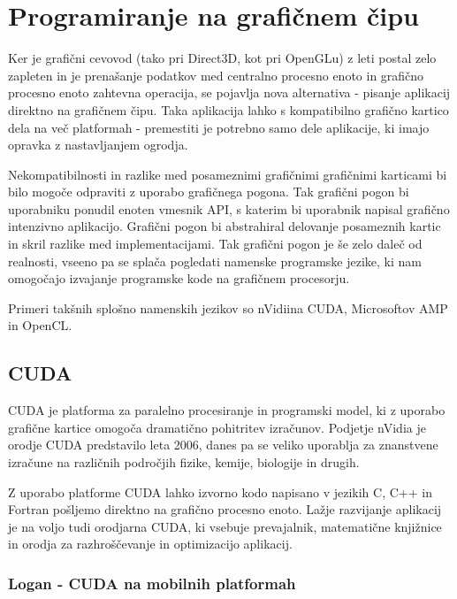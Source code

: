 \chapter{Programiranje na grafičnem čipu}


Ker je grafični cevovod (tako pri Direct3D, kot pri OpenGLu) z leti postal zelo zapleten in je prenašanje podatkov med centralno procesno enoto in grafično procesno enoto zahtevna operacija, se pojavlja nova alternativa - pisanje aplikacij direktno na grafičnem čipu. Taka aplikacija lahko s kompatibilno grafično kartico dela na več platformah - premestiti je potrebno samo dele aplikacije, ki imajo opravka z nastavljanjem ogrodja. 

Nekompatibilnosti in razlike med posameznimi grafičnimi grafičnimi karticami bi bilo mogoče odpraviti z uporabo grafičnega pogona. Tak grafični pogon bi uporabniku ponudil enoten vmesnik API, s katerim bi uporabnik napisal grafično intenzivno aplikacijo. Grafični pogon bi abstrahiral delovanje posameznih kartic in skril razlike med implementacijami. Tak grafični pogon je še zelo daleč od realnosti, vseeno pa se splača pogledati namenske programske jezike, ki nam omogočajo izvajanje programske kode na grafičnem procesorju.

Primeri takšnih splošno namenskih jezikov so nVidiina CUDA, Microsoftov AMP in OpenCL.

\section{CUDA}
CUDA \cite{cuda} je platforma za paralelno procesiranje in programski model, ki z uporabo grafične kartice omogoča dramatično pohitritev izračunov. Podjetje nVidia je orodje CUDA predstavilo leta 2006, danes pa se veliko uporablja za znanstvene izračune na različnih področjih fizike, kemije, biologije in drugih.

Z uporabo platforme CUDA lahko izvorno kodo napisano v jezikih C, C++ in Fortran pošljemo direktno na grafično procesno enoto. Lažje razvijanje aplikacij je na voljo tudi orodjarna CUDA, ki vsebuje prevajalnik, matematične knjižnice in orodja za razhroščevanje in optimizacijo aplikacij.

\subsection{Logan - CUDA na mobilnih platformah}

